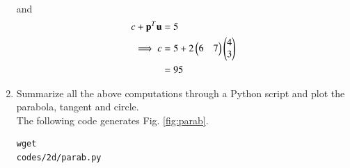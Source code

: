 \begin{enumerate}[label=\arabic*.,ref=\thesubsection.\theenumi]
\begin{align}
\end{align}
%
and
\begin{align}
c +\mathbf{p}^T\mathbf{u}&= 5
\\
\implies c &= 5+2\begin{pmatrix}6 & 7\end{pmatrix}  \begin{pmatrix}4 \\ 3\end{pmatrix}
\\
 &= 95
\end{align}
%
\item Summarize all the above computations through a Python script and plot 
the parabola, tangent and circle.
\\
\solution The following code generates Fig. \ref{fig:parab}.
\begin{lstlisting}
wget 
codes/2d/parab.py
\end{lstlisting}
\begin{figure}[!ht]
\centering

\end{figure}
\end{enumerate}
